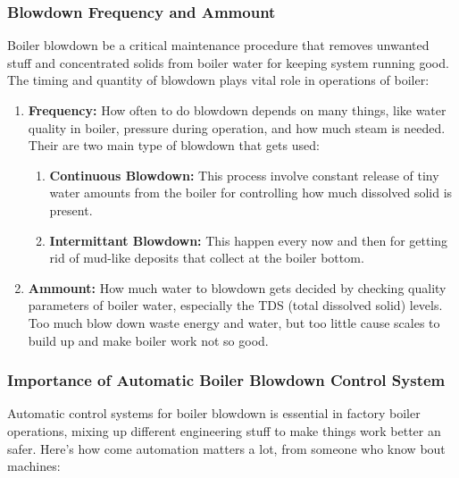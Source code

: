 \subsubsection{Blowdown Frequency and Ammount}
Boiler blowdown be a critical maintenance procedure that removes unwanted stuff and concentrated solids from boiler water for keeping system running good. The timing and quantity of blowdown plays vital role in operations of boiler:

\begin{enumerate}
\item \textbf{Frequency:} How often to do blowdown depends on many things, like water quality in boiler, pressure during operation, and how much steam is needed. Their are two main type of blowdown that gets used:
\begin{enumerate}
\item \textbf{Continuous Blowdown:} This process involve constant release of tiny water amounts from the boiler for controlling how much dissolved solid is present.
\item \textbf{Intermittant Blowdown:} This happen every now and then for getting rid of mud-like deposits that collect at the boiler bottom.
\end{enumerate}
\item \textbf{Ammount:} How much water to blowdown gets decided by checking quality parameters of boiler water, especially the TDS (total dissolved solid) levels. Too much blow down waste energy and water, but too little cause scales to build up and make boiler work not so good.
\end{enumerate}

\subsubsection{Importance of Automatic Boiler Blowdown Control System}
Automatic control systems for boiler blowdown is essential in factory boiler operations, mixing up different engineering stuff to make things work better an safer. Here's how come automation matters a lot, from someone who know bout machines:

